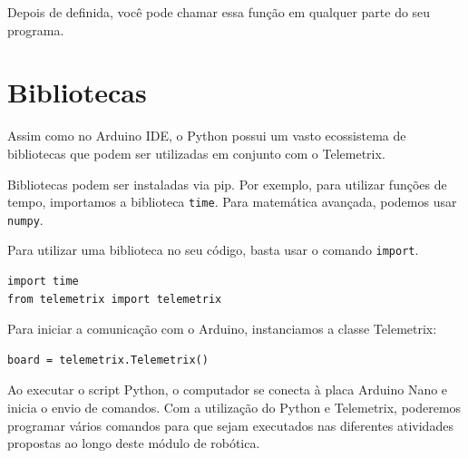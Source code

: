 \documentclass[lang=pt,11pt]{elegantbook}
\begin{document}
Depois de definida, você pode chamar essa função em qualquer parte do seu programa.

\section{Bibliotecas}

Assim como no Arduino IDE, o Python possui um vasto ecossistema de bibliotecas que podem ser utilizadas em conjunto com o Telemetrix.

Bibliotecas podem ser instaladas via pip. Por exemplo, para utilizar funções de tempo, importamos a biblioteca \lstinline{time}. Para matemática avançada, podemos usar \lstinline{numpy}.

Para utilizar uma biblioteca no seu código, basta usar o comando \lstinline{import}.

\begin{lstlisting}
import time
from telemetrix import telemetrix
\end{lstlisting}

Para iniciar a comunicação com o Arduino, instanciamos a classe Telemetrix:

\begin{lstlisting}
board = telemetrix.Telemetrix()
\end{lstlisting}

Ao executar o script Python, o computador se conecta à placa Arduino Nano e inicia o envio de comandos. Com a utilização do Python e Telemetrix, poderemos programar vários comandos para que sejam executados nas diferentes atividades propostas ao longo deste módulo de robótica.
\end{document}
